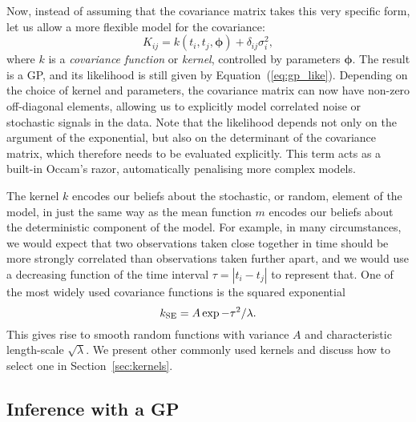 \documentclass[letterpaper]{ar-1col}
\newcommand{\suz}[1]{\textcolor{magenta}{#1}}
\begin{document}
Now, instead of assuming that the covariance matrix takes this very specific form, let us allow a more flexible model for the covariance:
\begin{equation}
  K_{ij} = k(t_i,t_j,\boldsymbol{\phi}) + \delta_{ij} \sigma_i^2,
\end{equation}
where $k$ is a \emph{covariance function} or \emph{kernel}, controlled by parameters $\boldsymbol{\phi}$. The result is a GP, and its likelihood is still given by Equation~(\ref{eq:gp_like}). Depending on the choice of kernel and parameters, the covariance matrix can now have non-zero off-diagonal elements, allowing us to explicitly model correlated noise or stochastic signals in the data. 
Note that the likelihood depends not only on the argument of the exponential, but also on the determinant of the covariance matrix, which therefore needs to be evaluated explicitly. This term acts as a built-in Occam's razor, automatically penalising more complex models.

The kernel $k$ encodes our beliefs about the stochastic, or random, element of the model, in just the same way as the mean function $m$ encodes our beliefs about the deterministic component of the model. For example, in many circumstances, we would expect that two observations taken close together in time should be more strongly correlated than observations taken further apart, and we would use a decreasing function of the time interval $\tau=|t_i-t_j|$ to represent that. One of the most widely used covariance functions is the squared exponential 
\begin{equation}
    k_{\rm SE} = A \exp{-\tau^2/\lambda}.
\end{equation}
This gives rise to smooth random functions with variance $A$ and characteristic length-scale $\sqrt{\lambda}$. We present other commonly used kernels and discuss how to select one in Section~\ref{sec:kernels}.

\subsection{Inference with a GP}

\end{document}
